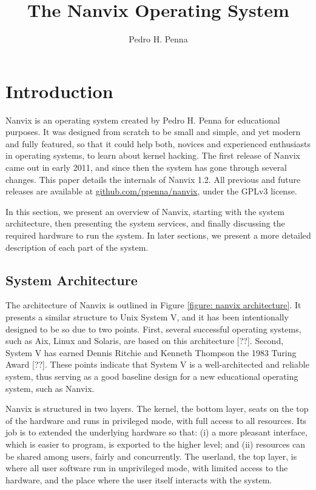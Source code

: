 \documentclass[10pt,a4paper]{article}
\author{Pedro H. Penna}
\title{The Nanvix Operating System}
\begin{document}
\maketitle

\section{Introduction}
\label{section: introduction}

Nanvix is an operating system created by Pedro H. Penna for educational purposes. It was designed from scratch to be small and simple, and yet modern and fully featured, so that it could help both, novices and experienced enthusiasts in operating systems, to learn about kernel hacking. The first release of Nanvix came out in early 2011, and since then the system has gone through several changes. This paper details the internals of Nanvix 1.2. All previous and future releases are available at \url{github.com/ppenna/nanvix}, under the GPLv3 license.

In this section, we present an overview of Nanvix, starting with the system architecture, then presenting the system services, and finally discussing the required hardware to run the system. In later sections, we present a more detailed description of each part of the system.

\subsection{System Architecture}
\label{section: system architecture}

The architecture of Nanvix is outlined in Figure \ref{figure: nanvix architecture}. It presents a similar structure to Unix System V, and it has been intentionally designed to be so due to two points. First, several successful operating systems, such as Aix, Linux and Solaris, are based on this architecture [??]. Second, System V has earned Dennis Ritchie and Kenneth Thompson the 1983 Turing Award [??]. These points indicate that System V is a well-architected and reliable system, thus serving as a good baseline design for a new educational operating system, such as Nanvix.

Nanvix is structured in two layers. The kernel, the bottom layer, seats on the top of the hardware and runs in privileged mode, with full access to all resources. Its job is to extended the underlying hardware so that: (i) a more pleasant interface, which is easier to program, is exported to the higher level; and (ii) resources can be shared among users, fairly and concurrently. The userland, the top layer, is where all user software run in unprivileged mode, with limited access to the hardware, and the place where the user itself interacts with the system.
\end{document}

